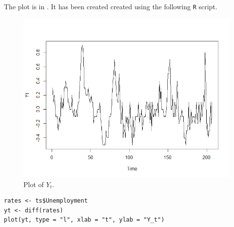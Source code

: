 \documentclass{article}
\theoremstyle{plain}
\theoremstyle{definition}
\newenvironment{exercise}[1]
  {\renewcommand\theexerciseaux{#1}\exerciseaux\label{ejer:#1}}
  {\endexerciseaux}
\newenvironment{sol}{\begin{trivlist}
 \item[\hskip \labelsep {\textit{Solution}.}\hskip \labelsep]}{\end{trivlist}}
\begin{document}
\begin{exercise}{2}
\end{exercise}
\begin{sol}
The plot is in . It has been created created using the following \texttt{R} script.
\begin{figure}
\centering
\includegraphics[scale=0.5]{Yt}
\caption{Plot of $Y_t$.}\label{Yt}
\end{figure}

\lstset{language=R,
showstringspaces=false,
tab=\rightarrowfill}
\begin{lstlisting}
rates <- ts$Unemployment
yt <- diff(rates)
plot(yt, type = "l", xlab = "t", ylab = "Y_t")
\end{lstlisting}
\end{sol}
\end{document}
